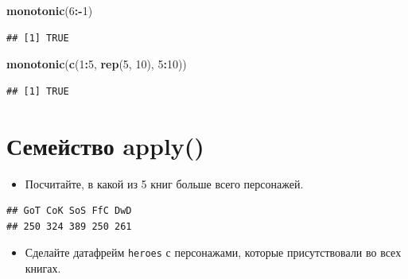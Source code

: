 \documentclass[]{book}
\newenvironment{Shaded}{\begin{snugshade}}{\end{snugshade}}
\newcommand{\KeywordTok}[1]{\textcolor[rgb]{0.13,0.29,0.53}{\textbf{#1}}}
\newcommand{\DecValTok}[1]{\textcolor[rgb]{0.00,0.00,0.81}{#1}}
\newcommand{\OperatorTok}[1]{\textcolor[rgb]{0.81,0.36,0.00}{\textbf{#1}}}
\newcommand{\NormalTok}[1]{#1}
\providecommand{\tightlist}{%
  \setlength{\itemsep}{0pt}\setlength{\parskip}{0pt}}
\begin{document}
\begin{Shaded}
\begin{Highlighting}[]
\KeywordTok{monotonic}\NormalTok{(}\DecValTok{6}\OperatorTok{:-}\DecValTok{1}\NormalTok{)}
\end{Highlighting}
\end{Shaded}

\begin{verbatim}
## [1] TRUE
\end{verbatim}

\begin{Shaded}
\begin{Highlighting}[]
\KeywordTok{monotonic}\NormalTok{(}\KeywordTok{c}\NormalTok{(}\DecValTok{1}\OperatorTok{:}\DecValTok{5}\NormalTok{, }\KeywordTok{rep}\NormalTok{(}\DecValTok{5}\NormalTok{, }\DecValTok{10}\NormalTok{), }\DecValTok{5}\OperatorTok{:}\DecValTok{10}\NormalTok{))}
\end{Highlighting}
\end{Shaded}

\begin{verbatim}
## [1] TRUE
\end{verbatim}

\section{Семейство apply()}\label{task_text}

\begin{itemize}
\tightlist
\item
  Посчитайте, в какой из 5 книг больше всего персонажей.
\end{itemize}

\begin{verbatim}
## GoT CoK SoS FfC DwD 
## 250 324 389 250 261
\end{verbatim}

\begin{itemize}
\tightlist
\item
  Сделайте датафрейм \texttt{heroes} с персонажами, которые
  присутствовали во всех книгах.
\end{itemize}
\end{document}
